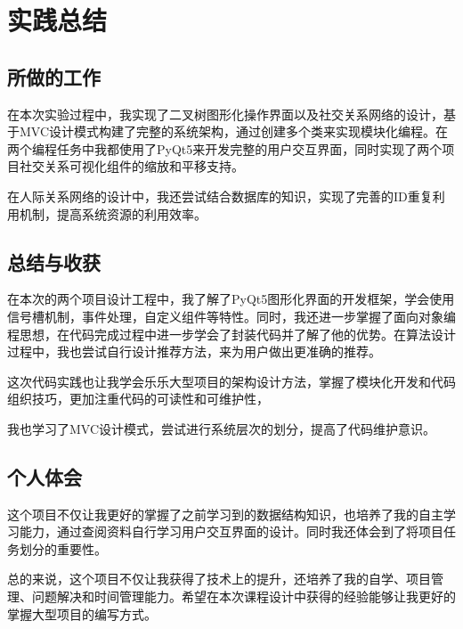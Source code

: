 \documentclass[12pt,a4paper]{article}
\begin{document}
\section{实践总结}

\subsection{所做的工作}

在本次实验过程中，我实现了二叉树图形化操作界面以及社交关系网络的设计，基于MVC设计模式构建了完整的系统架构，通过创建多个类来实现模块化编程。在两个编程任务中我都使用了PyQt5来开发完整的用户交互界面，同时实现了两个项目社交关系可视化组件的缩放和平移支持。

在人际关系网络的设计中，我还尝试结合数据库的知识，实现了完善的ID重复利用机制，提高系统资源的利用效率。

\subsection{总结与收获}

在本次的两个项目设计工程中，我了解了PyQt5图形化界面的开发框架，学会使用信号槽机制，事件处理，自定义组件等特性。同时，我还进一步掌握了面向对象编程思想，在代码完成过程中进一步学会了封装代码并了解了他的优势。在算法设计过程中，我也尝试自行设计推荐方法，来为用户做出更准确的推荐。

这次代码实践也让我学会乐乐大型项目的架构设计方法，掌握了模块化开发和代码组织技巧，更加注重代码的可读性和可维护性，

我也学习了MVC设计模式，尝试进行系统层次的划分，提高了代码维护意识。

\subsection{个人体会}

这个项目不仅让我更好的掌握了之前学习到的数据结构知识，也培养了我的自主学习能力，通过查阅资料自行学习用户交互界面的设计。同时我还体会到了将项目任务划分的重要性。

总的来说，这个项目不仅让我获得了技术上的提升，还培养了我的自学、项目管理、问题解决和时间管理能力。希望在本次课程设计中获得的经验能够让我更好的掌握大型项目的编写方式。 
\end{document}
